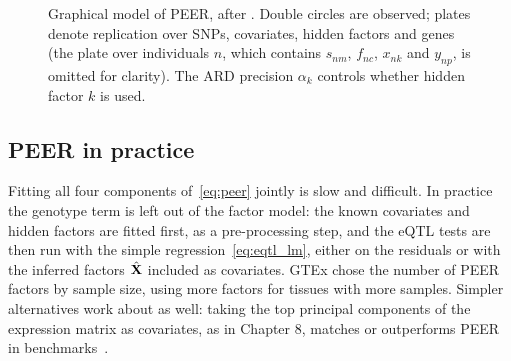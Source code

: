 \begin{figure}[!htbp]
  \centering
  \caption{Graphical model of PEER, after \citet{stegle2010}. Double circles are observed; plates denote replication over SNPs, covariates, hidden factors and genes (the plate over individuals $n$, which contains $s_{nm}$, $f_{nc}$, $x_{nk}$ and $y_{np}$, is omitted for clarity). The ARD precision $\alpha_k$ controls whether hidden factor $k$ is used.}
  \label{fig:peer_model}
\end{figure}

\subsection{PEER in practice}

Fitting all four components of~\eqref{eq:peer} jointly is slow and difficult. In practice the genotype term is left out of the factor model: the known covariates and hidden factors are fitted first, as a pre-processing step, and the eQTL tests are then run with the simple regression~\eqref{eq:eqtl_lm}, either on the residuals or with the inferred factors $\hat{\mathbf{X}}$ included as covariates. GTEx chose the number of PEER factors by sample size, using more factors for tissues with more samples. Simpler alternatives work about as well: taking the top principal components of the expression matrix as covariates, as in Chapter 8, matches or outperforms PEER in benchmarks~\citep{zhou2022pca}.

